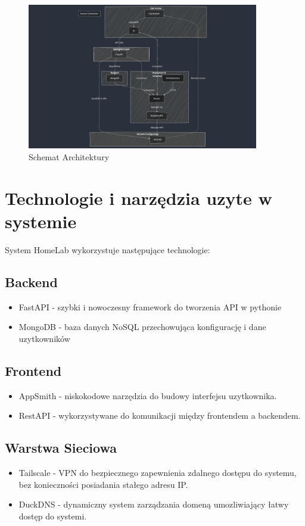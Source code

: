 \begin{figure}
    \begin{center}
        \includegraphics[width=0.9\textwidth]{./chapters/mermeid/schemat_architektury.png}
        \caption{Schemat Architektury}
    \end{center}
\end{figure}


\section{Technologie i narzędzia uzyte w systemie}

System HomeLab wykorzystuje następujące technologie:
\subsection{Backend}
\begin{itemize}
    \item FastAPI - szybki i nowoczesny framework do tworzenia API w pythonie
    \item MongoDB - baza danych NoSQL przechowująca konfigurację i dane uzytkowników
\end{itemize}
\subsection{Frontend}
\begin{itemize}
    \item AppSmith - niskokodowe narzędzia do budowy interfejsu uzytkownika.
    \item RestAPI - wykorzystywane do komunikacji między frontendem a backendem.
\end{itemize}
\subsection{Warstwa Sieciowa}
\begin{itemize}
    \item Tailscale - VPN do bezpiecznego zapewnienia zdalnego dostępu do systemu, bez konieczności posiadania stałego adresu IP.
    \item DuckDNS - dynamiczny system zarządzania domeną umozliwiający łatwy dostęp do systemi.
\end{itemize}
